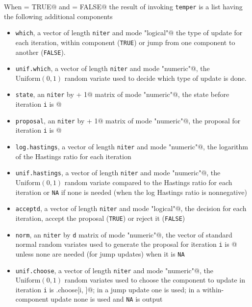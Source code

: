 \documentclass{article}
\begin{document}
When \verb@debug = TRUE@ and \verb@parallel = FALSE@
the result of invoking \texttt{temper} is a list having
the following additional components
\begin{itemize}
\item \texttt{which}, a vector of length \texttt{niter}
    and mode \verb@"logical"@ the type of update for each iteration,
    within component (\texttt{TRUE}) or jump from one component to
    another (\texttt{FALSE}).
\item \texttt{unif.which}, a vector of length \texttt{niter}
    and mode \verb@"numeric"@, the $\text{Uniform}(0, 1)$ random variate
    used to decide which type of update is done.
\item \texttt{state}, an \texttt{niter} by \verb@d + 1@
    matrix of mode \verb@"numeric"@, the state before iteration \texttt{i}
    is \verb@state[i, ]@
\item \texttt{proposal}, an \texttt{niter} by \verb@d + 1@
    matrix of mode \verb@"numeric"@, the proposal for iteration \texttt{i}
    is \verb@proposal[i, ]@
\item \texttt{log.hastings}, a vector of length \texttt{niter}
    and mode \verb@"numeric"@, the logarithm of the Hastings ratio for
    each iteration
\item \texttt{unif.hastings}, a vector of length \texttt{niter}
    and mode \verb@"numeric"@, the $\text{Uniform}(0, 1)$ random variate
    compared to the Hastings ratio for each iteration or \texttt{NA} if
    none is needed (when the log Hastings ratio is nonnegative)
\item \texttt{acceptd}, a vector of length \texttt{niter}
    and mode \verb@"logical"@, the decision for each iteration,
    accept the proposal (\texttt{TRUE}) or reject it (\texttt{FALSE})
\item \texttt{norm}, an \texttt{niter} by \texttt{d} matrix
    of mode \verb@"numeric"@, the vector of standard normal random variates
    used to generate the proposal for iteration \texttt{i} is \verb@z[i, ]@
    unless none are needed (for jump updates) when it is \texttt{NA} 
\item \texttt{unif.choose}, a vector of length \texttt{niter}
    and mode \verb@"numeric"@, the $\text{Uniform}(0, 1)$
    random variates used to choose the component to update in iteration
    \texttt{i} is \verb@unif.choose[i, ]@; in a jump update one is used;
    in a within-component update none is used and \texttt{NA} is output
\end{itemize}
\end{document}
